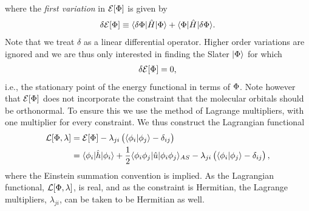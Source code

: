         where the \emph{first variation} in $\mathcal{E}[\Phi]$ is given by
        \begin{align}
            \delta\mathcal{E}[\Phi]
            \equiv
            \langle \delta\Phi |\hat{H}| \Phi \rangle + \langle \Phi |\hat{H}| \delta\Phi \rangle.
        \end{align}
        Note that we treat $\delta$ as a linear differential operator. Higher
        order variations are ignored and we are thus only interested in finding
        the Slater $| \Phi \rangle$ for which
        \begin{align}
            \delta\mathcal{E}[\Phi] = 0,
        \end{align}
        i.e., the stationary point of the energy functional in terms of $\Phi$.
        Note however that $\mathcal{E}[\Phi]$ does not incorporate the
        constraint that the molecular orbitals should be orthonormal. To ensure
        this we use the method of Lagrange multipliers, with one multiplier for
        every constraint. We thus construct the Lagrangian functional
        \begin{align}
            \mathcal{L}[\Phi, \lambda]
            &= \mathcal{E}[\Phi]
            - \lambda_{ji}\left( 
                \langle \phi_i | \phi_j \rangle
                - \delta_{ij}
             \right)
            \\
            &=
            \langle \phi_i |\hat{h}| \phi_i \rangle
            + \frac{1}{2}\langle \phi_i\phi_j |\hat{u}| \phi_i\phi_j \rangle_{AS}
            - \lambda_{ji}\left( 
                \langle \phi_i | \phi_j \rangle
                - \delta_{ij}
             \right),
        \end{align}
        where the Einstein summation convention is implied. As the Lagrangian
        functional, $\mathcal{L}[\Phi, \lambda]$, is real, and as the
        constraint is Hermitian, the Lagrange multipliers, $\lambda_{ji}$, can
        be taken to be Hermitian as well.


